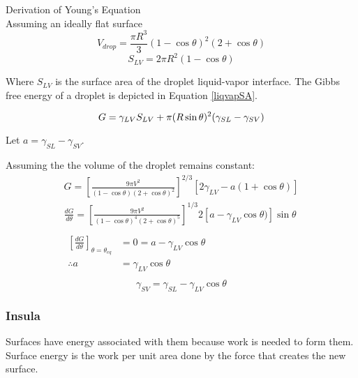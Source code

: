 \begin{outline}[enumerate]
	\1 Derivation of Young's Equation\\
	Assuming an ideally flat surface
	\begin{equation} \label{dropvol}
	V_{drop} = \frac{\pi R^{3}}{3} (1-\cos\theta)^{2} (2+\cos\theta)
	\end{equation}
	\begin{equation} \label{liqvapSA}
	S_{LV} = 2\pi R^{2} (1-\cos\theta)
	\end{equation}
	
	Where $S_{LV}$ is the surface area of the droplet liquid-vapor interface. The Gibbs free energy of a droplet is depicted in Equation \ref{liqvapSA}.
	
	\begin{equation} \label{gibbsdroplet}
	G = \gamma_{LV} S_{LV} + \pi(R \sin\theta)^{2} (\gamma_{SL}-\gamma_{SV})\\
	\end{equation}
	
	Let $a = \gamma_{SL}-\gamma_{SV}$. 
	
	Assuming the the volume of the droplet remains constant:
	\begin{equation*}
	\begin{gathered}
	G = \left[\frac{9\pi V^{2}}{(1-\cos\theta)(2+\cos\theta)^{2}}\right]^{2/3}
	\left[2\gamma_{LV} - a(1+\cos\theta)\right]\\
	\frac{dG}{d\theta} = \left[\frac{9\pi V^{2}}{(1-\cos\theta)^{4}(2+\cos\theta)^{5}}\right]^{1/3}
	2\left[a-\gamma_{LV}\cos\theta)\right]\sin\theta\\ \\
	\begin{split}
	\left[\frac{dG}{d\theta}\right]_{\theta=\theta_{eq}}&=0=a-\gamma_{LV}\cos\theta\\
	\therefore a 	&= \gamma_{LV}\cos\theta\\
	\end{split}					
	\end{gathered}
	\end{equation*}
	\begin{equation}\label{youngs-eqn}
	\boxed{\gamma_{SV} =\gamma_{SL}-\gamma_{LV}\cos\theta}	
	\end{equation}
\end{outline}

\subsubsection{\textbf{Insula}}
Surfaces have energy associated with them because work is needed to form them. Surface energy is the work per unit area done by the force that creates the new surface.

